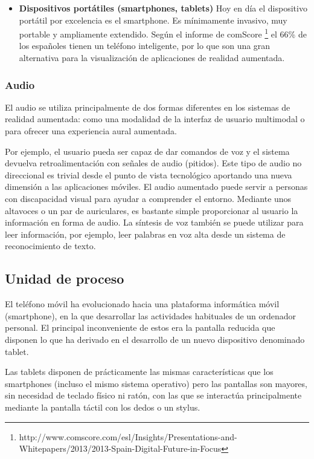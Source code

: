 \begin{itemize}
\item \textbf{Dispositivos portátiles (smartphones, tablets)}
  Hoy en día el dispositivo portátil por excelencia es el smartphone. Es mínimamente invasivo, muy portable y ampliamente extendido. Según el informe de comScore \footnote{http://www.comscore.com/esl/Insights/Presentations-and-Whitepapers/2013/2013-Spain-Digital-Future-in-Focus} el 66\% de los españoles tienen un teléfono inteligente, por lo que son una gran alternativa para la visualización de aplicaciones de realidad aumentada.
\end{itemize}

\subsubsection{Audio}
El audio se utiliza principalmente de dos formas diferentes en los sistemas de realidad aumentada: como una modalidad de la interfaz de usuario multimodal o para ofrecer una experiencia aural aumentada. 

Por ejemplo, el usuario pueda ser capaz de dar comandos de voz y el sistema devuelva retroalimentación con señales de audio (pitidos). Este tipo de audio no direccional es trivial desde el punto de vista tecnológico aportando una nueva dimensión a las aplicaciones móviles. El audio aumentado puede servir a personas con discapacidad visual para ayudar a comprender el entorno. Mediante unos altavoces o un par de auriculares, es bastante simple proporcionar al usuario la información en forma de audio. La síntesis de voz también se puede utilizar para leer información, por ejemplo, leer palabras en voz alta desde un sistema de reconocimiento de texto.

\subsection{Unidad de proceso}
El teléfono móvil ha evolucionado hacia una plataforma informática móvil (smartphone), en la que desarrollar las actividades habituales de un ordenador personal. El principal inconveniente de estos era la pantalla reducida que disponen lo que ha derivado en el desarrollo de un nuevo dispositivo denominado tablet. 

Las tablets disponen de prácticamente las mismas características que los smartphones (incluso el mismo sistema operativo) pero las pantallas son mayores, sin necesidad de teclado físico ni ratón, con las que se interactúa principalmente mediante la pantalla táctil con los dedos o un stylus.

